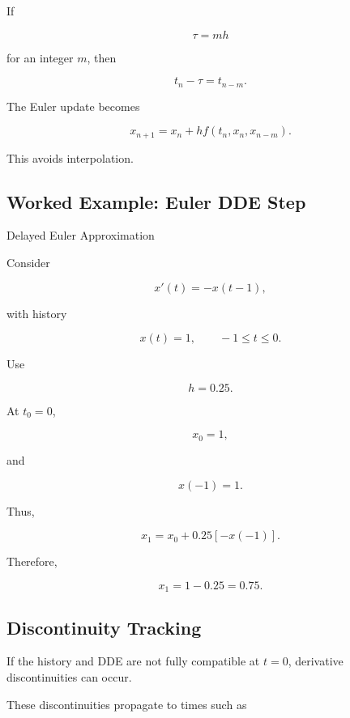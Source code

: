 If

\[
\tau=mh
\]

for an integer \(m\), then

\[
t_n-\tau
=
t_{n-m}.
\]

The Euler update becomes

\[
\boxed{
x_{n+1}
=
x_n
+
h
f
\left(
t_n,
x_n,
x_{n-m}
\right).
}
\]

This avoids interpolation.

\subsection{Worked Example: Euler DDE Step}
\label{subsec:worked-euler-dde}

\begin{workedexamplebox}{Delayed Euler Approximation}

Consider

\[
x'(t)
=
-x(t-1),
\]

with history

\[
x(t)=1,
\qquad
-1\leq t\leq0.
\]

Use

\[
h=0.25.
\]

At \(t_0=0\),

\[
x_0=1,
\]

and

\[
x(-1)=1.
\]

Thus,

\[
x_1
=
x_0
+
0.25[-x(-1)].
\]

Therefore,

\begin{answerbox}
\[
\boxed{
x_1
=
1-0.25
=
0.75.
}
\]
\end{answerbox}

\end{workedexamplebox}

\subsection{Discontinuity Tracking}
\label{subsec:dde-discontinuity-tracking}

If the history and DDE are not fully compatible at \(t=0\), derivative
discontinuities can occur.

These discontinuities propagate to times such as

